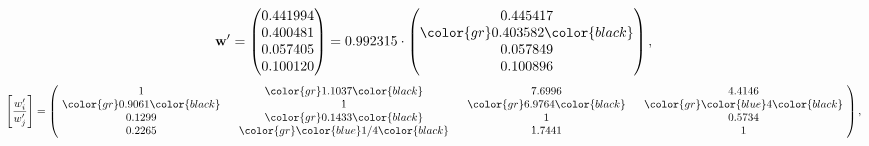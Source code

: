 \begin{example}
\begin{equation*}
\mathbf{w}^{\prime} =
\begin{pmatrix}
0.441994\\
0.400481\\
0.057405\\
0.100120
\end{pmatrix} =
0.992315\cdot
\begin{pmatrix}
0.445417\\
\color{gr} 0.403582\color{black} \\
0.057849\\
0.100896
\end{pmatrix},
\end{equation*}
\begin{equation*}
\left[ \frac{{w}^{\prime}_i}{{w}^{\prime}_j} \right] =
\begin{pmatrix}
$\,\,$ 1 $\,\,$ & $\,\,$\color{gr} 1.1037\color{black} $\,\,$ & $\,\,$7.6996$\,\,$ & $\,\,$4.4146$\,\,$ \\
$\,\,$\color{gr} 0.9061\color{black} $\,\,$ & $\,\,$ 1 $\,\,$ & $\,\,$\color{gr} 6.9764\color{black} $\,\,$ & $\,\,$\color{gr} \color{blue} 4\color{black}   $\,\,$ \\
$\,\,$0.1299$\,\,$ & $\,\,$\color{gr} 0.1433\color{black} $\,\,$ & $\,\,$ 1 $\,\,$ & $\,\,$0.5734 $\,\,$ \\
$\,\,$0.2265$\,\,$ & $\,\,$\color{gr} \color{blue}  1/4\color{black} $\,\,$ & $\,\,$1.7441$\,\,$ & $\,\,$ 1  $\,\,$ \\
\end{pmatrix},
\end{equation*}
\end{example}
\newpage
